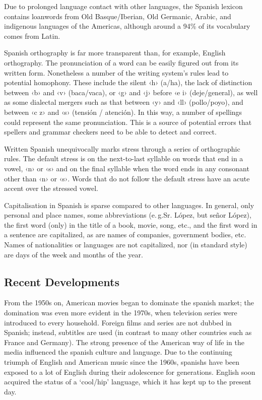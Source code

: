 \begin{multicols}{2}
Due to prolonged language contact with other languages, the Spanish lexicon contains loanwords from Old Basque/Iberian, Old Germanic, Arabic, and indigenous languages of the Americas, although around a 94\% of its vocabulary comes from Latin.


Spanish orthography is far more transparent than, for example, English orthography.  The pronunciation of a word can be easily figured out from its written form. Nonetheless a number of the writing system's rules lead to potential homophony. These include the silent ‹h› (a/ha), the lack of distinction between ‹b› and ‹v› (baca/vaca), or ‹g› and ‹j› before ‹e i› (deje/general), as well as some dialectal mergers such as that between ‹y› and ‹ll› (pollo/poyo), and between ‹c z› and ‹s› (tensión / atención). In this way, a number of spellings could represent the same pronunciation. This is a source of potential errors that spellers and grammar checkers need to be able to detect and correct.

Written Spanish unequivocally marks stress through a series of orthographic rules. The default stress is on the next-to-last syllable on words that end in a vowel, ‹n› or ‹s› and on the final syllable when the word ends in any consonant other than ‹n› or ‹s›. Words that do not follow the default stress have an acute accent over the stressed vowel.

Capitalisation in Spanish is sparse compared to other languages. In general, only personal and place names, some abbreviations (e.\,g.Sr. López, but señor López), the first word (only) in the title of a book, movie, song, etc., and the first word in a sentence are capitalized, as are names of companies, government bodies, etc. Names of nationalities or languages are not capitalized, nor (in standard style) are days of the week and months of the year.

\subsection{Recent Developments}

From the 1950s on, American movies began to dominate the spanish market; the domination was even more evident in the 1970s, when television series were introduced to every household. Foreign films and series are not dubbed in Spanish; instead, subtitles are used (in contrast to many other countries such as France and Germany). The strong presence of the American way of life in the media influenced the spanish culture and language. Due to the continuing triumph of English and American music since the 1960s, spanishs have been exposed to a lot of English during their adolescence for generations. English soon acquired the status of a ‘cool/hip’ language, which it has kept up to the present day.


\end{multicols}
